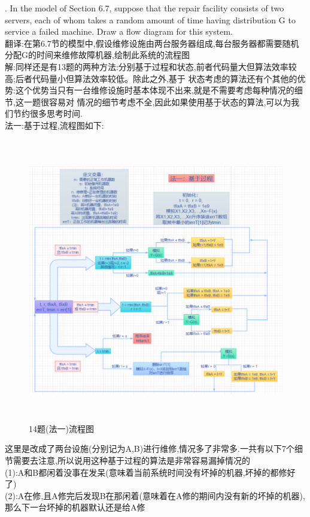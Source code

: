\documentclass{book}
\begin{document}
. In the model of Section 6.7, suppose that the repair facility consists of two servers, each of
whom takes a random amount of time having distribution G to service a failed machine. Draw a
flow diagram for this system. \\
翻译:在第6.7节的模型中,假设维修设施由两台服务器组成,每台服务器都需要随机分配G的时间来维修故障机器,绘制此系统的流程图 \\
解:同样还是有13题的两种方法:分别基于过程和状态,前者代码量大但算法效率较高;后者代码量小但算法效率较低。除此之外,基于
状态考虑的算法还有个其他的优势:这个优势当只有一台维修设施时基本体现不出来,就是不需要考虑每种情况的细节,这一题很容易对
情况的细节考虑不全,因此如果使用基于状态的算法,可以为我们节约很多思考时间. \\
法一:基于过程,流程图如下: \\
\begin{figure}[H]
    \centering
    \includegraphics*[height = 12.4cm, width = 13.6cm]{gramFile/十四题/14题(法一)流程图.PNG}
    \caption{14题(法一)流程图}
\end{figure}
\noindent
这里是改成了两台设施(分别记为A,B)进行维修,情况多了非常多.一共有以下7个细节需要去注意,所以说用这种基于过程的算法是非常容易漏掉情况的 \\
(1):A和B都闲着没事在发呆(意味着当前系统时间没有坏掉的机器,坏掉的都修好了)  \\
(2):A在修,且A修完后发现B在那闲着(意味着在A修的期间内没有新的坏掉的机器),那么下一台坏掉的机器默认还是给A修  \\
\end{document}
